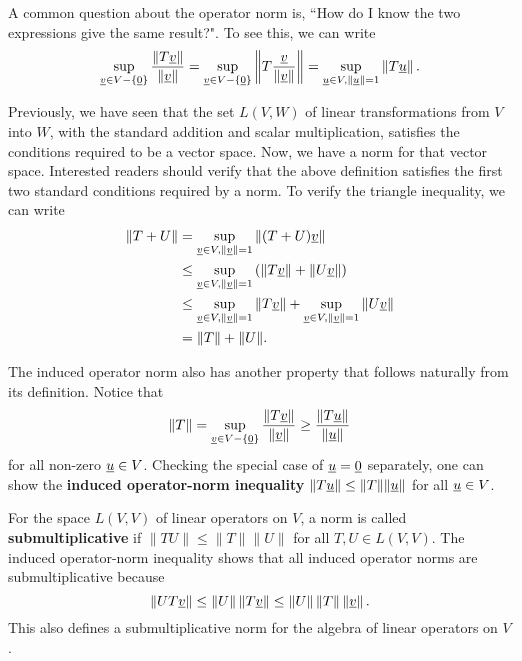 A common question about the operator norm is, ``How do I know the two expressions give the same result?".
To see this, we can write
\begin{equation*}
\sup_{ \underline{v} \in V - \left\{ \underline{0} \right\} }
\frac{ \left\| T \underline{v} \right\| }{ \left\| \underline{v} \right\| }
= \sup_{ \underline{v} \in V - \left\{ \underline{0} \right\} }
\left\| T \frac{\underline{v}}{\| \underline{v} \|} \right\|
= \sup_{\underline{u} \in V, \left\| \underline{u} \right\| = 1 }
\left\| T \underline{u} \right\| .
\end{equation*}

Previously, we have seen that the set $L(V,W)$ of linear transformations from $V$ into $W$, with the standard addition and scalar multiplication, satisfies the conditions required to be a vector space.
Now, we have a norm for that vector space.
Interested readers should verify that the above definition satisfies the first two standard conditions required by a norm.
To verify the triangle inequality, we can write
\begin{align*}
\| T + U \| &= \sup_{\underline{v} \in V, \left\| \underline{v} \right\| = 1 }
\left\| (T+U) \underline{v} \right\| \\
&\leq  \sup_{\underline{v} \in V, \left\| \underline{v} \right\| = 1 }
\left(  \left\| T \underline{v} \right\| + \left\| U \underline{v} \right\| \right) \\
& \leq \sup_{\underline{v} \in V, \left\| \underline{v} \right\| = 1 }
\left\| T \underline{v} \right\| + \sup_{\underline{v} \in V, \left\| \underline{v} \right\| = 1 }
\left\| U \underline{v} \right\| \\
&= \|T\| + \|U\|.
\end{align*}

The induced operator norm also has another property that follows naturally from its definition.
Notice that 
\[ \| T \| = \sup_{ \underline{v} \in V - \left\{ \underline{0} \right\} }
\frac{ \left\| T \underline{v} \right\| }{ \left\| \underline{v} \right\| } \geq \frac{ \left\| T \underline{u} \right\| }{ \left\| \underline{u} \right\| } \]
for all non-zero $\underline{u} \in V$.
Checking the special case of $\underline{u}=\underline{0}$ separately, one can show the \textbf{induced operator-norm inequality} $\| T \underline{u} \| \leq \| T \| \| \underline{u} \|$ for all $\underline{u}\in V$.

For the space $L(V,V)$ of linear operators on $V$, a norm is called \textbf{submultiplicative} if $\| T U \| \leq \|T\| \|U\|$ for all $T,U \in L(V,V)$.
The induced operator-norm inequality shows that all induced operator norms are submultiplicative because
\begin{equation*}
\left\| U T \underline{v} \right\| \leq \left\| U \right\| \left\| T \underline{v} \right\| \leq \left\| U \right\| \left\| T \right\| \left\| \underline{v} \right\| .
\end{equation*}
This also defines a submultiplicative norm for the algebra of linear operators on $V$.

